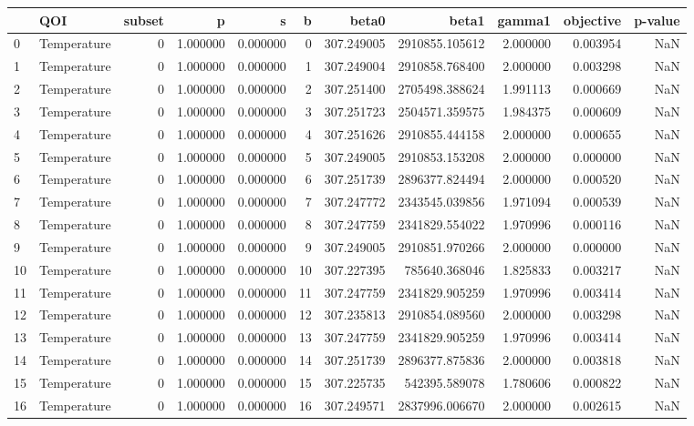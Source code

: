 \begin{tabular}{llrrrrrrrrr}
\toprule
 & QOI & subset & p & s & b & beta0 & beta1 & gamma1 & objective & p-value \\
\midrule
0 & Temperature & 0 & 1.000000 & 0.000000 & 0 & 307.249005 & 2910855.105612 & 2.000000 & 0.003954 & NaN \\
1 & Temperature & 0 & 1.000000 & 0.000000 & 1 & 307.249004 & 2910858.768400 & 2.000000 & 0.003298 & NaN \\
2 & Temperature & 0 & 1.000000 & 0.000000 & 2 & 307.251400 & 2705498.388624 & 1.991113 & 0.000669 & NaN \\
3 & Temperature & 0 & 1.000000 & 0.000000 & 3 & 307.251723 & 2504571.359575 & 1.984375 & 0.000609 & NaN \\
4 & Temperature & 0 & 1.000000 & 0.000000 & 4 & 307.251626 & 2910855.444158 & 2.000000 & 0.000655 & NaN \\
5 & Temperature & 0 & 1.000000 & 0.000000 & 5 & 307.249005 & 2910853.153208 & 2.000000 & 0.000000 & NaN \\
6 & Temperature & 0 & 1.000000 & 0.000000 & 6 & 307.251739 & 2896377.824494 & 2.000000 & 0.000520 & NaN \\
7 & Temperature & 0 & 1.000000 & 0.000000 & 7 & 307.247772 & 2343545.039856 & 1.971094 & 0.000539 & NaN \\
8 & Temperature & 0 & 1.000000 & 0.000000 & 8 & 307.247759 & 2341829.554022 & 1.970996 & 0.000116 & NaN \\
9 & Temperature & 0 & 1.000000 & 0.000000 & 9 & 307.249005 & 2910851.970266 & 2.000000 & 0.000000 & NaN \\
10 & Temperature & 0 & 1.000000 & 0.000000 & 10 & 307.227395 & 785640.368046 & 1.825833 & 0.003217 & NaN \\
11 & Temperature & 0 & 1.000000 & 0.000000 & 11 & 307.247759 & 2341829.905259 & 1.970996 & 0.003414 & NaN \\
12 & Temperature & 0 & 1.000000 & 0.000000 & 12 & 307.235813 & 2910854.089560 & 2.000000 & 0.003298 & NaN \\
13 & Temperature & 0 & 1.000000 & 0.000000 & 13 & 307.247759 & 2341829.905259 & 1.970996 & 0.003414 & NaN \\
14 & Temperature & 0 & 1.000000 & 0.000000 & 14 & 307.251739 & 2896377.875836 & 2.000000 & 0.003818 & NaN \\
15 & Temperature & 0 & 1.000000 & 0.000000 & 15 & 307.225735 & 542395.589078 & 1.780606 & 0.000822 & NaN \\
16 & Temperature & 0 & 1.000000 & 0.000000 & 16 & 307.249571 & 2837996.006670 & 2.000000 & 0.002615 & NaN \\

\end{tabular}
